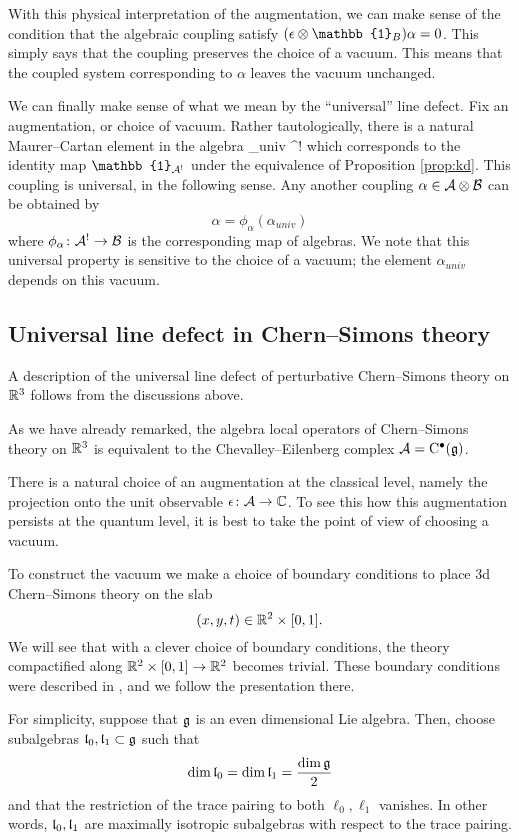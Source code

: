 \documentclass[11pt]{amsart}
\def\id{\mathbb{1}}
\begin{document}
With this physical interpretation of the augmentation, we can make sense of the condition that the algebraic coupling satisfy $(\ep \otimes \id_B) \alpha = 0$.
This simply says that the coupling preserves the choice of a vacuum.
This means that the coupled system corresponding to $\alpha$ leaves the vacuum unchanged.

We can finally make sense of what we mean by the ``universal'' line defect. 
Fix an augmentation, or choice of vacuum. 
Rather tautologically, there is a natural Maurer--Cartan element in the algebra 
\beqn\label{eqn:univ}
\alpha_{univ} \in \cA \otimes \cA^! 
\eeqn
which corresponds to the identity map $\id_{\cA^!}$ under the equivalence of Proposition \ref{prop:kd}. 
This coupling is universal, in the following sense. 
Any another coupling $\alpha \in \mathcal A \otimes \mathcal B$ can be obtained by
\[
\alpha = \phi_\alpha (\alpha_{univ})
\]
where $\phi_\alpha \colon \mathcal A^! \to \mathcal B$ is the corresponding map of algebras. 
We note that this universal property is sensitive to the choice of a vacuum; the element $\alpha_{univ}$ depends on this vacuum.  

\subsection{Universal line defect in Chern--Simons theory} 

A description of the universal line defect of perturbative Chern--Simons theory on $\mathbb R^3$ follows from the discussions above. 

As we have already remarked, the algebra local operators of Chern--Simons theory on $\mathbb R^3$ is equivalent to the Chevalley--Eilenberg complex $\mathcal A = {\rm C}^\bullet(\mathfrak g)$. 

There is a natural choice of an augmentation at the classical level, namely the projection onto the unit observable $\epsilon\colon \mathcal A \to \mathbb C$. 
To see this how this augmentation persists at the quantum level, it is best to take the point of view of choosing a vacuum. 

To construct the vacuum we make a choice of boundary conditions to place 3d Chern--Simons theory on the slab 
\[
(x,y,t) \in \mathbb R^2 \times [0,1] .
\]
We will see that with a clever choice of boundary conditions, the theory compactified along $\mathbb R^2 \times [0,1] \to \mathbb R^2$ becomes trivial. 
These boundary conditions were described in \cite{Nanna}, and we follow the presentation there. 

For simplicity, suppose that $\mathfrak g$ is an even dimensional Lie algebra. 
Then, choose subalgebras $\mathfrak{l}_0, \mathfrak{l}_1 \subset \mathfrak g$ such that 
\[
\dim \mathfrak{l}_0 = \dim \mathfrak{l}_1 = \frac{\dim \mathfrak g}{2} 
\]
and that the restriction of the trace pairing to both $\ell_0,\ell_1$ vanishes. 
In other words, $\mathfrak{l}_0, \mathfrak{l}_1$ are maximally isotropic subalgebras with respect to the trace pairing. 
\end{document}
